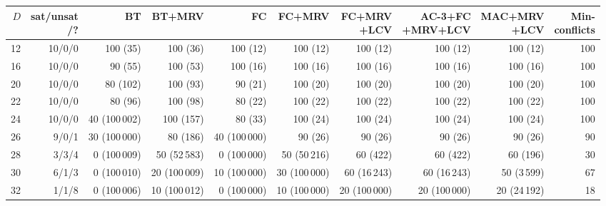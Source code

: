 \begin{tabular}{rrrrrrrrrr}
\toprule
$D$ & \makecell{sat/unsat\\/?} & BT & BT+MRV & FC & FC+MRV & \makecell{FC+MRV\\+LCV} & \makecell{AC-3+FC\\+MRV+LCV} & \makecell{MAC+MRV\\+LCV} & \makecell{Min-\\conflicts} \\
\midrule
12 & 10/0/0 & 100 (35) & 100 (36) & 100 (12) & 100 (12) & 100 (12) & 100 (12) & 100 (12) & 100 \\
16 & 10/0/0 & 90 (55) & 100 (53) & 100 (16) & 100 (16) & 100 (16) & 100 (16) & 100 (16) & 100 \\
20 & 10/0/0 & 80 (102) & 100 (93) & 90 (21) & 100 (20) & 100 (20) & 100 (20) & 100 (20) & 100 \\
22 & 10/0/0 & 80 (96) & 100 (98) & 80 (22) & 100 (22) & 100 (22) & 100 (22) & 100 (22) & 100 \\
24 & 10/0/0 & 40 (100\,002) & 100 (157) & 80 (33) & 100 (24) & 100 (24) & 100 (24) & 100 (24) & 100 \\
26 & 9/0/1 & 30 (100\,000) & 80 (186) & 40 (100\,000) & 90 (26) & 90 (26) & 90 (26) & 90 (26) & 90 \\
28 & 3/3/4 & 0 (100\,009) & 50 (52\,583) & 0 (100\,000) & 50 (50\,216) & 60 (422) & 60 (422) & 60 (196) & 30 \\
30 & 6/1/3 & 0 (100\,010) & 20 (100\,009) & 10 (100\,000) & 30 (100\,000) & 60 (16\,243) & 60 (16\,243) & 50 (3\,599) & 67 \\
32 & 1/1/8 & 0 (100\,006) & 10 (100\,012) & 0 (100\,000) & 10 (100\,000) & 20 (100\,000) & 20 (100\,000) & 20 (24\,192) & 18 \\
\bottomrule
\end{tabular}

